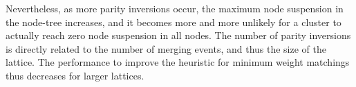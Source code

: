 Nevertheless, as more parity inversions occur, the maximum node suspension in the node-tree increases, and it becomes more and more unlikely for a cluster to actually reach zero node suspension in all nodes. The number of parity inversions is directly related to the number of merging events, and thus the size of the lattice. The performance to improve the heuristic for minimum weight matchings thus decreases for larger lattices. 

